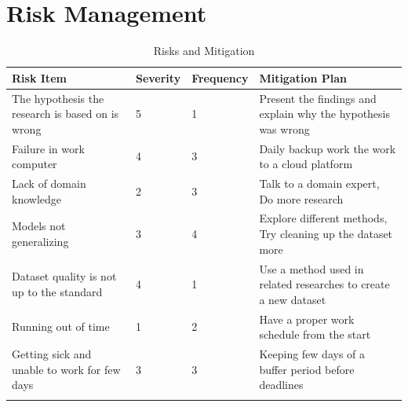 \section{Risk Management}


\begin{longtable}{|p{4cm}|p{2cm}|p{2cm}|p{7cm}|}
    \hline
    \textbf{Risk Item} & 
    \textbf{Severity} & 
    \textbf{Frequency} & 
    \textbf{Mitigation Plan}
    \\ \hline
    
    The hypothesis the research is based on is wrong & 
    5 & 
    1 & 
    Present the findings and explain why the hypothesis was wrong 
    \\ \hline
    
    Failure in work computer & 
    4 & 
    3 & 
    Daily backup work the work to a cloud platform 
    \\ \hline
    
    Lack of domain knowledge & 
    2 & 
    3 & 
    Talk to a domain expert, Do more research 
    \\ \hline
    
    Models not generalizing & 
    3 & 
    4 & 
    Explore different methods, Try cleaning up the dataset more 
    \\ \hline
    
    Dataset quality is not up to the standard & 
    4 & 
    1 & 
    Use a method used in related researches to create a new dataset 
    \\ \hline
    
    Running out of time & 
    1 & 
    2 & 
    Have a proper work schedule from the start 
    \\ \hline
    
    Getting sick and unable to work for few days & 
    3 & 
    3 & 
    Keeping few days of a buffer period before deadlines 
    \\ \hline
    \caption{Risks and Mitigation}
\end{longtable}